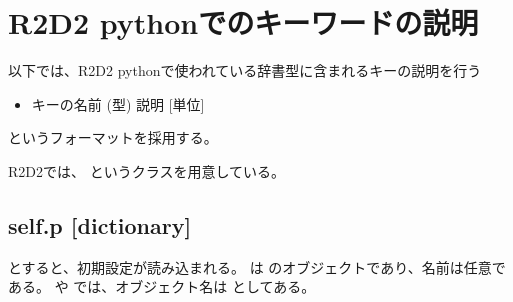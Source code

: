 \documentclass[letterpaper,10pt,dvipdfmx,report]{sphinxmanual}
\begin{document}
\chapter{R2D2 pythonでのキーワードの説明}
\label{\detokenize{notation:r2d2-python}}\label{\detokenize{notation::doc}}
以下では、R2D2 pythonで使われている辞書型に含まれるキーの説明を行う
\begin{itemize}
\item {} 
キーの名前 (型) \sphinxhyphen{}\sphinxhyphen{} 説明 {[}単位{]}

\end{itemize}

というフォーマットを採用する。

R2D2では、 というクラスを用意している。


\section{self.p {[}dictionary{]}}
\label{\detokenize{notation:self-p-dictionary}}
\begin{sphinxVerbatim}[commandchars=\\\{\}]
 
  
\end{sphinxVerbatim}

とすると、初期設定が読み込まれる。  は  のオブジェクトであり、名前は任意である。  や  では、オブジェクト名は  としてある。
\end{document}
